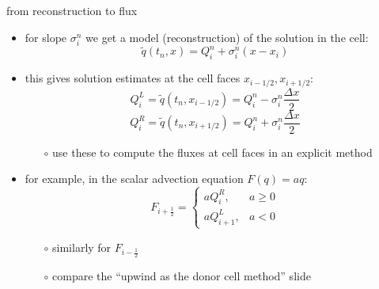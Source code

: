 \documentclass[10pt,dvipsnames,usepdftitle=false,
hyperref={pdftitle = {Finite volume methods},
    pdfauthor = {Ed Bueler}}]{beamer}
\newcommand{\half}{\tfrac{1}{2}}
\begin{document}
\begin{frame}{from reconstruction to flux}

\begin{itemize}
\item for slope $\sigma_i^n$ we get a model (reconstruction) of the solution in the cell:
    $$\tilde q(t_n,x) = Q_i^n + \sigma_i^n (x - x_i)$$
\item this gives solution estimates at the cell faces $x_{i-1/2},x_{i+1/2}$:
    $$Q^L_i = \tilde q(t_n,x_{i-1/2}) = Q_i^n - \sigma_i^n \frac{\Delta x}{2}$$
    $$Q^R_i = \tilde q(t_n,x_{i+1/2}) = Q_i^n + \sigma_i^n \frac{\Delta x}{2}$$
    \begin{itemize}
    \item[$\circ$] use these to compute the fluxes at cell faces in an explicit method
    \end{itemize}
\item for example, in the scalar advection equation $F(q)=aq$:
    $$F_{i+\half}=\begin{cases} a Q^R_i, & a \ge 0 \\
                                a Q^L_{i+1}, & a < 0\end{cases}$$
    \begin{itemize}
    \item[$\circ$] similarly for $F_{i-\half}$
    \item[$\circ$] compare the ``upwind as the donor cell method'' slide
    \end{itemize}
\end{itemize}
\end{frame}
\end{document}

